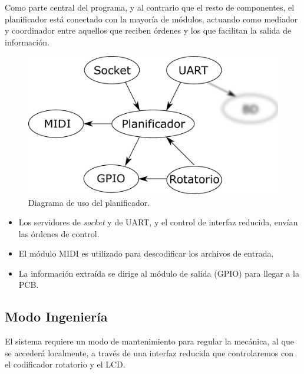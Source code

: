 Como parte central del programa, y al contrario que el resto de componentes, el planificador está conectado con la mayoría de módulos, actuando como mediador y coordinador entre aquellos que reciben órdenes y los que facilitan la salida de información.

\smallskip

\begin{figure}[H]
	\noindent \begin{centering}
		\includegraphics[width=\linewidth/2]{capitulo4/daemon_scheduler}
		\par\end{centering}
	\smallskip
	\caption{\label{fig:daemon_scheduler} Diagrama de uso del planificador.}
\end{figure} 

\smallskip

\begin{itemize}
	\item Los servidores de \textit{socket} y de \acrshort{UART}, y el control de interfaz reducida, envían las órdenes de control.
	\item El módulo \acrshort{MIDI} es utilizado para descodificar los archivos de entrada.
	\item La información extraída se dirige al módulo de salida (\acrshort{GPIO}) para llegar a la \acrshort{PCB}.
\end{itemize}

\subsection{Modo Ingeniería}

El sistema requiere un modo de mantenimiento para regular la mecánica, al que se accederá localmente, a través de una interfaz reducida que controlaremos con el codificador rotatorio y el \acrshort{LCD}.

